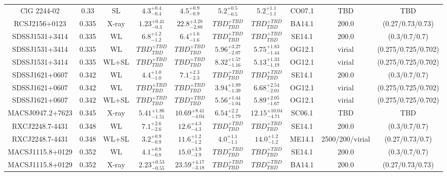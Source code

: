 \begin{table}
\begin{tabular}{cccccccccc}
ClG 2244-02 & 0.33 & SL & ${4.3}^{+0.4}_{-0.4}$ & ${4.5}^{+0.9}_{-0.9}$ & ${5.2}^{+0.5}_{-0.5}$ & ${5.2}^{+1.1}_{-1.1}$ & CO07.1 & TBD & TBD \\
RCSJ2156+0123 & 0.335 & X-ray & ${1.23}^{+0.41}_{-0.3}$ & ${22.8}^{+3.28}_{-2.88}$ & ${TBD}^{+TBD}_{TBD}$ & ${TBD}^{+TBD}_{TBD}$ & BA14.1 & 200.0 & (0.27/0.73/0.73) \\
SDSSJ1531+3414 & 0.335 & WL & ${6.8}^{+1.2}_{-1.2}$ & ${6.4}^{+1.6}_{-1.6}$ & ${TBD}^{+TBD}_{TBD}$ & ${TBD}^{+TBD}_{TBD}$ & SE14.1 & 200.0 & (0.3/0.7/0.7) \\
SDSSJ1531+3414 & 0.335 & WL & ${TBD}^{+TBD}_{TBD}$ & ${TBD}^{+TBD}_{TBD}$ & ${5.96}^{+3.27}_{-2.07}$ & ${5.75}^{+1.83}_{-1.44}$ & OG12.1 & virial & (0.275/0.725/0.702) \\
SDSSJ1531+3414 & 0.335 & WL+SL & ${TBD}^{+TBD}_{TBD}$ & ${TBD}^{+TBD}_{TBD}$ & ${8.32}^{+1.57}_{-1.16}$ & ${5.13}^{+1.33}_{-1.19}$ & OG12.1 & virial & (0.275/0.725/0.702) \\
SDSSJ1621+0607 & 0.342 & WL & ${4.4}^{+1.0}_{-1.0}$ & ${7.1}^{+2.3}_{-2.3}$ & ${TBD}^{+TBD}_{TBD}$ & ${TBD}^{+TBD}_{TBD}$ & SE14.1 & 200.0 & (0.3/0.7/0.7) \\
SDSSJ1621+0607 & 0.342 & WL & ${TBD}^{+TBD}_{TBD}$ & ${TBD}^{+TBD}_{TBD}$ & ${3.94}^{+1.89}_{-1.39}$ & ${6.68}^{+2.54}_{-2.01}$ & OG12.1 & virial & (0.275/0.725/0.702) \\
SDSSJ1621+0607 & 0.342 & WL+SL & ${TBD}^{+TBD}_{TBD}$ & ${TBD}^{+TBD}_{TBD}$ & ${5.56}^{+1.44}_{-1.04}$ & ${5.89}^{+2.05}_{-1.67}$ & OG12.1 & virial & (0.275/0.725/0.702) \\
MACSJ0947.2+7623 & 0.345 & X-ray & ${5.41}^{+1.86}_{-1.51}$ & ${10.69}^{+8.41}_{-4.04}$ & ${6.54}^{+2.2}_{-1.79}$ & ${12.15}^{+10.04}_{-4.71}$ & SC06.1 & TBD & TBD \\
RXCJ2248.7-4431 & 0.348 & WL & ${7.1}^{+2.6}_{-2.6}$ & ${12.6}^{+4.3}_{-4.3}$ & ${TBD}^{+TBD}_{TBD}$ & ${TBD}^{+TBD}_{TBD}$ & SE14.1 & 200.0 & (0.3/0.7/0.7) \\
RXCJ2248.7-4431 & 0.348 & WL+SL & ${3.2}^{+0.9}_{-0.9}$ & ${11.6}^{+1.2}_{-1.2}$ & ${4.0}^{+1.1}_{-1.1}$ & ${14.0}^{+1.2}_{-1.2}$ & ME14.1 & 2500/200/virial & (0.27/0.73/0.7) \\
MACSJ1115.8+0129 & 0.352 & WL & ${4.1}^{+0.8}_{-0.8}$ & ${15.0}^{+3.9}_{-3.9}$ & ${TBD}^{+TBD}_{TBD}$ & ${TBD}^{+TBD}_{TBD}$ & SE14.1 & 200.0 & (0.3/0.7/0.7) \\
MACSJ1115.8+0129 & 0.352 & X-ray & ${2.23}^{+0.53}_{-0.55}$ & ${23.59}^{+4.17}_{-3.18}$ & ${TBD}^{+TBD}_{TBD}$ & ${TBD}^{+TBD}_{TBD}$ & BA14.1 & 200.0 & (0.27/0.73/0.73) \\

\end{tabular}
\end{table}
